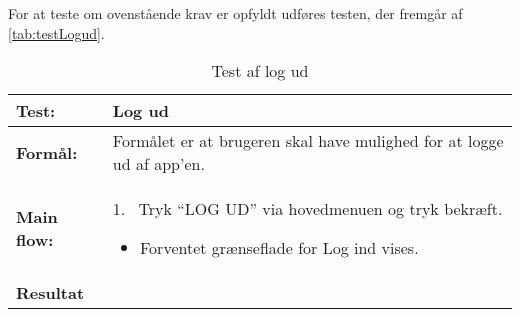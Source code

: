 \noindet
For at teste om ovenstående krav er opfyldt udføres testen, der fremgår af \autoref{tab:testLogud}.

\begin{table} [H]
	\centering
  \begin{tabular}{ | l | p{14cm} |} \hline
    \textbf{Test:} & Log ud \\ \hline
  \textbf{Formål:} & Formålet er at brugeren skal have mulighed for at logge ud af app’en.
 \\ \hline
 	\textbf{Main flow:} & 1.~ Tryk “LOG UD” via hovedmenuen og tryk bekræft.
 	\begin{itemize} [label={\checkmark}]
 	\item Forventet grænseflade for Log ind vises.
 	\end{itemize}	
\\ \hline
\textbf{Resultat} &\\ \hline
   \end{tabular}
   \caption{Test af log ud}
    \label{tab:testLogud}
\end{table}





